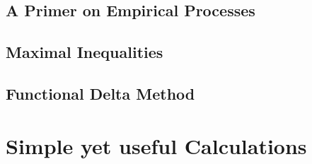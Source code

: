 \documentclass[11pt, a4paper, BCOR=10mm, DIV=9]{scrbook}
\theoremstyle{definition}
\theoremstyle{plain}
\begin{document}
\section{A Primer on Empirical Processes}


\section{Maximal Inequalities}


\section{Functional Delta Method}


\chapter{Simple yet useful Calculations} 



\printnomenclature

{}

\end{document}
